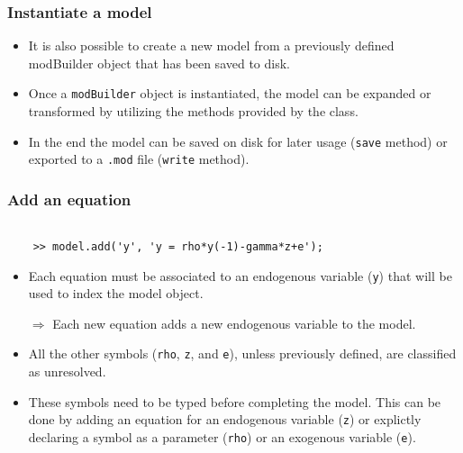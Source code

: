 \documentclass[10pt,slidestop]{beamer}
\theoremstyle{plain}
\begin{document}
\begin{frame}[c,fragile]
  \frametitle{Instantiate a model}

  \begin{itemize}

  \item It is also possible to create a new model from a previously defined modBuilder object that has been saved to disk.\newline

  \item Once a \verb+modBuilder+ object is instantiated, the model can be expanded or transformed by utilizing the methods provided by the class.\newline

  \item In the end the model can be saved on disk for later usage (\verb+save+ method) or exported to a \verb+.mod+ file (\verb+write+ method).

  \end{itemize}

\end{frame}


\begin{frame}[c,fragile]
  \frametitle{Add an equation}

  \begin{lstlisting}[style=MatlabConsole]

    >> model.add('y', 'y = rho*y(-1)-gamma*z+e');
   \end{lstlisting}

   \bigskip

  \begin{itemize}

  \item Each equation must be associated to an endogenous variable (\verb+y+) that will be used to index the model object.\newline

  \item[$\Rightarrow$] Each new equation adds a new endogenous variable to the model.\newline

  \item All the other symbols (\verb+rho+, \verb+z+, and \verb+e+), unless previously defined, are classified as unresolved.\newline

  \item These symbols need to be typed before completing the model. This can be done by adding an equation for an endogenous variable (\verb+z+) or explictly declaring a symbol as a parameter (\verb+rho+) or an exogenous variable (\verb+e+).

  \end{itemize}

\end{frame}
\end{document}
